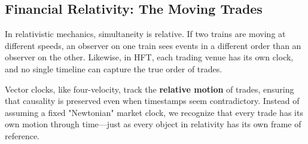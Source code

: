 \subsection{Financial Relativity: The Moving Trades}

In relativistic mechanics, simultaneity is relative. If two trains are moving at different speeds, an observer on one train sees events in a different order than an observer on the other. Likewise, in HFT, each trading venue has its own clock, and no single timeline can capture the true order of trades.

Vector clocks, like four-velocity, track the \textbf{relative motion} of trades, ensuring that causality is preserved even when timestamps seem contradictory. Instead of assuming a fixed "Newtonian" market clock, we recognize that every trade has its own motion through time—just as every object in relativity has its own frame of reference.

\newpage


